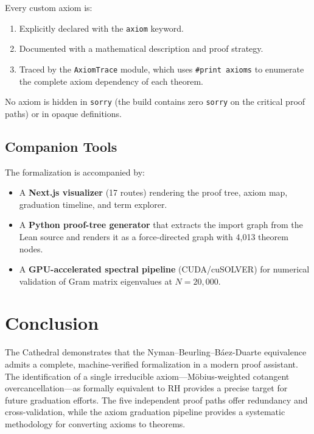 \documentclass[11pt,a4paper]{article}
\theoremstyle{definition}
\newcommand{\lean}[1]{\texttt{#1}}
\newcommand{\sorry}{\texttt{sorry}}
\begin{document}
Every custom axiom is:
\begin{enumerate}
  \item Explicitly declared with the \lean{axiom} keyword.
  \item Documented with a mathematical description and proof strategy.
  \item Traced by the \lean{AxiomTrace} module, which uses
    \lean{\#print axioms} to enumerate the complete axiom dependency
    of each theorem.
\end{enumerate}

No axiom is hidden in \sorry{} (the build contains zero \sorry{}
on the critical proof paths) or in opaque definitions.

\subsection{Companion Tools}

The formalization is accompanied by:
\begin{itemize}
  \item A \textbf{Next.js visualizer} (17 routes) rendering the
    proof tree, axiom map, graduation timeline, and term explorer.
  \item A \textbf{Python proof-tree generator} that extracts the
    import graph from the Lean source and renders it as a force-directed
    graph with 4,013 theorem nodes.
  \item A \textbf{GPU-accelerated spectral pipeline} (CUDA/cuSOLVER)
    for numerical validation of Gram matrix eigenvalues at
    $N = 20{,}000$.
\end{itemize}

\section{Conclusion}
\label{sec:conclusion}

The Cathedral demonstrates that the Nyman--Beurling--B\'aez-Duarte
equivalence admits a complete, machine-verified formalization in
a modern proof assistant. The identification of a single irreducible
axiom---M\"obius-weighted cotangent overcancellation---as formally
equivalent to RH provides a precise target for future graduation
efforts. The five independent proof paths offer redundancy and
cross-validation, while the axiom graduation pipeline provides a
systematic methodology for converting axioms to theorems.
\end{document}
